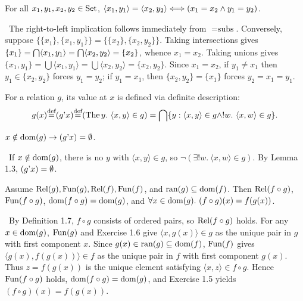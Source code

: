 \documentclass[10pt,a4paper]{article}
\begin{document}
\begin{lemma}
For all $x_1, y_1, x_2, y_2 \in {\textrm{Set}}$, $\langle x_1, y_1 \rangle = \langle x_2, y_2 \rangle \Longleftrightarrow (x_1 = x_2 \land y_1 = y_2)$.
\end{lemma}
\myprf\ The right-to-left implication follows immediately from $=\textrm{subs}$. Conversely, suppose $\{\{x_1\}, \{x_1, y_1\}\} = \{\{x_2\}, \{x_2, y_2\}\}$. Taking intersections gives $\{x_1\} = {\bigcap} \langle x_1, y_1 \rangle = {\bigcap} \langle x_2, y_2 \rangle = \{x_2\}$, whence $x_1 = x_2$. Taking unions gives $\{x_1, y_1\} = \bigcup \langle x_1, y_1 \rangle = \bigcup \langle x_2, y_2 \rangle = \{x_2, y_2\}$. Since $x_1 = x_2$, if $y_1 \neq x_1$ then $y_1 \in \{x_2, y_2\}$ forces $y_1 = y_2$; if $y_1 = x_1$, then $\{x_2, y_2\} = \{x_1\}$ forces $y_2 = x_1 = y_1$. \myqed

For a relation $g$, its value at $x$ is defined via definite description:
$$g(x) {\stackrel{{\textrm{def}}}{=}} (g{\textrm{'}} x) {\stackrel{{\textrm{def}}}{=}} ({\textrm{The\,}} y.\ \langle x, y\rangle \in g) = {\bigcap} \{y : \langle x,y\rangle \in g \land !w.\ \langle x,w\rangle \in g\}.$$

\begin{exercise}
$x\notin {\textrm{dom}}(g)\to (g{\textrm{'}} x)=\emptyset$.
\end{exercise}
\myprf\ If $x \notin {\textrm{dom}}(g)$, there is no $y$ with $\langle x,y\rangle \in g$, so $\neg(\exists !w.\ \langle x,w\rangle \in g)$. By Lemma 1.3, $(g{\textrm{'}} x) = \emptyset$. \myqed

\begin{lemma}
Assume ${\textrm{Rel}}(g), {\textrm{Fun}}(g), {\textrm{Rel}}(f), {\textrm{Fun}}(f)$, and $\textrm{ran}(g) \subseteq {\textrm{dom}}(f)$. Then ${\textrm{Rel}}(f \circ g)$, ${\textrm{Fun}}(f \circ g)$, ${\textrm{dom}}(f \circ g) = {\textrm{dom}}(g)$, and $\forall x \in {\textrm{dom}}(g).\ (f \circ g)(x) = f(g(x))$.
\end{lemma}
\myprf\ By Definition 1.7, $f \circ g$ consists of ordered pairs, so ${\textrm{Rel}}(f \circ g)$ holds. For any $x \in {\textrm{dom}}(g)$, ${\textrm{Fun}}(g)$ and Exercise 1.6 give $\langle x, g(x) \rangle \in g$ as the unique pair in $g$ with first component $x$. Since $g(x) \in \textrm{ran}(g) \subseteq {\textrm{dom}}(f)$, ${\textrm{Fun}}(f)$ gives $\langle g(x), f(g(x)) \rangle \in f$ as the unique pair in $f$ with first component $g(x)$. Thus $z = f(g(x))$ is the unique element satisfying $\langle x, z \rangle \in f \circ g$. Hence ${\textrm{Fun}}(f \circ g)$ holds, ${\textrm{dom}}(f \circ g) = {\textrm{dom}}(g)$, and Exercise 1.5 yields $(f \circ g)(x) = f(g(x))$. \myqed
\end{document}
